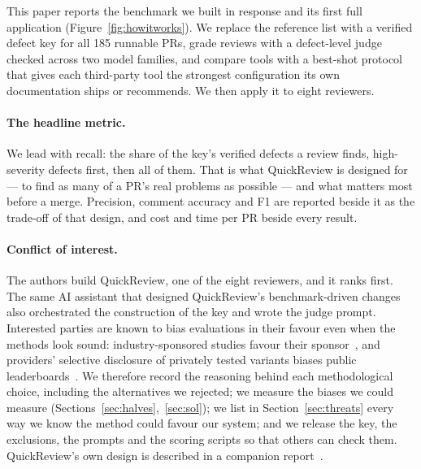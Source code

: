 \documentclass[11pt,a4paper]{article}
\newcommand{\qcr}{QuickReview}
\begin{document}
This paper reports the benchmark we built in response and its first full
application (Figure~\ref{fig:howitworks}). We replace the reference list with
a verified defect key for all 185 runnable PRs, grade reviews with a
defect-level judge checked across two model families, and compare tools with
a best-shot protocol that gives each third-party tool the strongest
configuration its own documentation ships or recommends. We then apply it to
eight reviewers.

\paragraph{The headline metric.} We lead with recall: the share of the key's
verified defects a review finds, high-severity defects first, then all of
them. That is what \qcr{} is designed for --- to find as many of a PR's real
problems as possible --- and what matters most before a merge. Precision,
comment accuracy and F1 are reported beside it as the trade-off of that
design, and cost and time per PR beside every result.

\paragraph{Conflict of interest.} The authors build \qcr{}, one of
the eight reviewers, and it ranks first. The same AI assistant that designed
\qcr{}'s benchmark-driven changes also orchestrated the construction of the
key and wrote the judge prompt. Interested parties are known to bias
evaluations in their favour even when the methods look sound:
industry-sponsored studies favour their sponsor~\cite{lundh2017}, and
providers' selective disclosure of privately tested variants biases public
leaderboards~\cite{singh2025leaderboard}.
We therefore record the reasoning behind each methodological choice,
including the alternatives we rejected; we measure the biases we could
measure (Sections~\ref{sec:halves},~\ref{sec:sol}); we list in
Section~\ref{sec:threats} every way we know the method could favour our
system; and we release the key, the exclusions, the prompts and the scoring
scripts so that others can check them. \qcr{}'s own design is described in a
companion report~\cite{qcrreport}.
\end{document}
